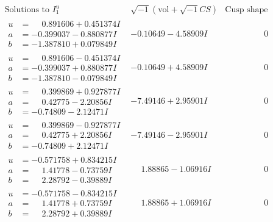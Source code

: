 \documentclass[1p]{elsarticle_modified}
\theoremstyle{definition}
\newcommand{\I}{\sqrt{-1}}
\begin{document}
$$\begin{array}{c|c|c}  
\text{Solutions to }I^u_{1}& \I (\text{vol} + \sqrt{-1}CS) & \text{Cusp shape}\\
 \hline 
\begin{aligned}
u &= \phantom{-}0.891606 + 0.451374 I \\
a &= -0.399037 - 0.880877 I \\
b &= -1.387810 + 0.079849 I\end{aligned}
 & -0.10649 - 4.58909 I & \phantom{-0.000000 } 0 \\ \hline\begin{aligned}
u &= \phantom{-}0.891606 - 0.451374 I \\
a &= -0.399037 + 0.880877 I \\
b &= -1.387810 - 0.079849 I\end{aligned}
 & -0.10649 + 4.58909 I & \phantom{-0.000000 } 0 \\ \hline\begin{aligned}
u &= \phantom{-}0.399869 + 0.927877 I \\
a &= \phantom{-}0.42775 - 2.20856 I \\
b &= -0.74809 - 2.12471 I\end{aligned}
 & -7.49146 + 2.95901 I & \phantom{-0.000000 } 0 \\ \hline\begin{aligned}
u &= \phantom{-}0.399869 - 0.927877 I \\
a &= \phantom{-}0.42775 + 2.20856 I \\
b &= -0.74809 + 2.12471 I\end{aligned}
 & -7.49146 - 2.95901 I & \phantom{-0.000000 } 0 \\ \hline\begin{aligned}
u &= -0.571758 + 0.834215 I \\
a &= \phantom{-}1.41778 - 0.73759 I \\
b &= \phantom{-}2.28792 - 0.39889 I\end{aligned}
 & \phantom{-}1.88865 - 1.06916 I & \phantom{-0.000000 } 0 \\ \hline\begin{aligned}
u &= -0.571758 - 0.834215 I \\
a &= \phantom{-}1.41778 + 0.73759 I \\
b &= \phantom{-}2.28792 + 0.39889 I\end{aligned}
 & \phantom{-}1.88865 + 1.06916 I & \phantom{-0.000000 } 0 \\ \hline\begin{aligned}

\end{aligned}
\end{array}$$
\end{document}
